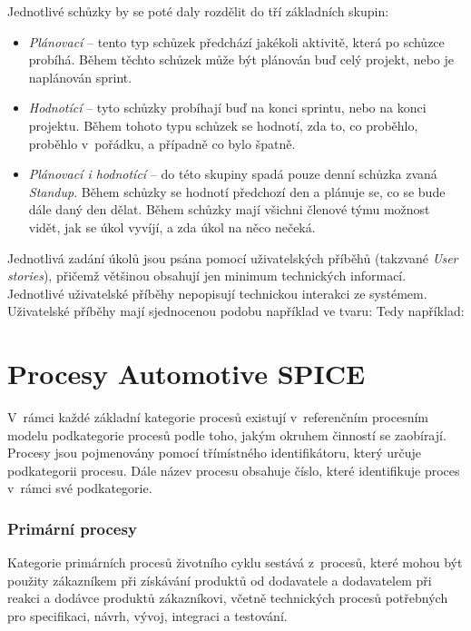 \documentclass[czech,master]{diploma}
\begin{document}
Jednotlivé schůzky by se poté daly rozdělit do tří základních skupin:

\begin{itemize}
\item \textit{Plánovací} -- tento typ schůzek předchází jakékoli aktivitě, která po schůzce probíhá. Během těchto schůzek může být plánován buď celý projekt, nebo je naplánován sprint.
\item \textit{Hodnotící} -- tyto schůzky probíhají buď na konci sprintu, nebo na konci projektu. Během tohoto typu schůzek se hodnotí, zda to, co proběhlo, proběhlo v~pořádku, a případně co bylo špatně.
\item \textit{Plánovací i hodnotící} -- do této skupiny spadá pouze denní schůzka zvaná \textit{Standup}. Během schůzky se hodnotí předchozí den a plánuje se, co se bude dále daný den dělat. Během schůzky mají všichni členové týmu možnost vidět, jak se úkol vyvíjí, a zda úkol na něco nečeká.
\end{itemize}


Jednotlivá zadání úkolů jsou psána pomocí uživatelských příběhů (takzvané \textit{User stories}), přičemž většinou obsahují jen minimum technických informací. Jednotlivé uživatelské příběhy nepopisují technickou interakci ze systémem. Uživatelské příběhy mají  sjednocenou podobu například ve tvaru:  Tedy například:  \cite{ref:scrum_myslin_us}


\chapter{Procesy Automotive SPICE}
\label{sec:aspice_processes_apendix}
V~rámci každé základní kategorie procesů existují v~referenčním procesním modelu podkategorie procesů podle toho, jakým okruhem činností se zaobírají. Procesy jsou pojmenovány pomocí třímístného identifikátoru, který určuje podkategorii procesu. Dále název procesu obsahuje číslo, které identifikuje proces v~rámci své podkategorie.

\subsection{Primární procesy}
Kategorie primárních procesů životního cyklu sestává z~procesů, které mohou být použity zákazníkem při získávání produktů od dodavatele a dodavatelem při reakci a dodávce produktů zákazníkovi, včetně technických procesů potřebných pro specifikaci, návrh, vývoj, integraci a testování.
\end{document}
